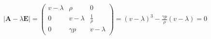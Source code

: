 \documentclass[preview]{standalone}
\begin{document}
\begin{center}
$|\pmb{A} - \lambda \pmb{E}| = 	\begin{pmatrix} v - \lambda & \rho & 0\\ 0 & v - \lambda & \frac{1}{\rho}\\ 0 & \gamma p & v - \lambda \end{pmatrix} = (v - \lambda)^3 - \frac{\gamma p}{\rho} (v - \lambda) = 0$
\end{center}
\end{document}
